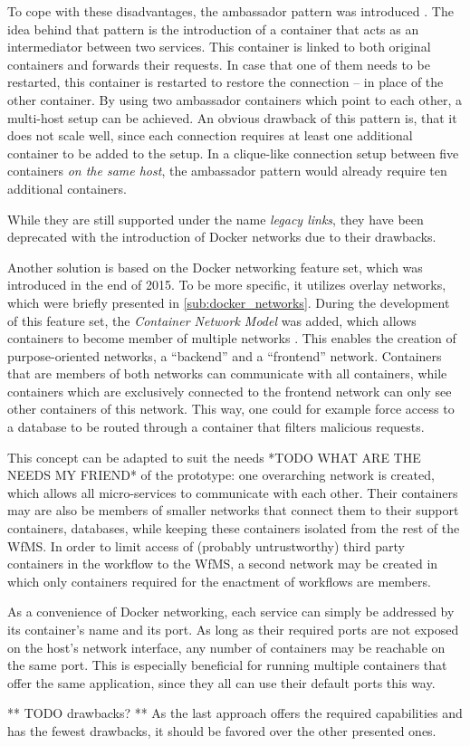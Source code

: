   To cope with these disadvantages, the ambassador pattern was introduced \cite{Docker2016Docker}. The idea behind that pattern is the introduction of a container that acts as an intermediator between two services. This container is linked to both original containers and forwards their requests. In case that one of them needs to be restarted, this container is restarted to restore the connection -- in place of the other container.
  By using two ambassador containers which point to each other, a multi-host setup can be achieved.
  An obvious drawback of this pattern is, that it does not scale well, since each connection requires at least one additional container to be added to the setup. In a clique-like connection setup between five containers \emph{on the same host}, the ambassador pattern would already require ten additional containers.

  While they are still supported under the name \emph{legacy links}, they have been deprecated with the introduction of Docker networks due to their drawbacks.

  Another solution is based on the Docker networking feature set, which was introduced in the end of 2015.
  To be more specific, it utilizes overlay networks, which were briefly presented in \ref{sub:docker_networks}. During the development of this feature set, the \emph{Container Network Model} was added, which allows containers to become member of multiple networks \cite{Tucker2015Docker}.
  This enables the creation of purpose-oriented networks, \eg a ``backend'' and a ``frontend'' network. Containers that are members of both networks can communicate with all containers, while containers which are exclusively connected to the frontend network can only see other containers of this network. This way, one could for example force access to a database to be routed through a container that filters malicious requests.

  This concept can be adapted to suit the needs *TODO WHAT ARE THE NEEDS MY FRIEND* of the prototype: one overarching network is created, which allows all micro-services to communicate with each other. Their containers may are also be members of smaller networks that connect them to their support containers, \eg databases, while keeping these containers isolated from the rest of the \ac{WfMS}. In order to limit access of (probably untrustworthy) third party containers in the workflow to the \ac{WfMS}, a second network may be created in which only containers required for the enactment of workflows are members.

  As a convenience of Docker networking, each service can simply be addressed by its container's name and its port. As long as their required ports are not exposed on the host's network interface, any number of containers may be reachable on the same port. This is especially beneficial for running multiple containers that offer the same application, since they all can use their default ports this way.

  ** TODO drawbacks? **
  As the last approach offers the required capabilities and has the fewest drawbacks, it should be favored over the other presented ones.
